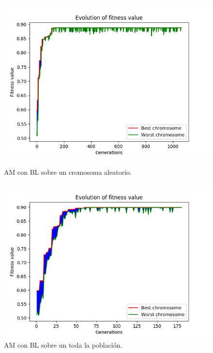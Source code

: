 \documentclass[11pt,a4paper]{article}
\begin{document}
\begin{figure}[H]
\centering
\begin{minipage}{.5\textwidth}
	\centering
	\includegraphics[scale=0.43]{img/am-rand-texture.png}
	\caption{AM con BL sobre un cromosoma aleatorio.}
\end{minipage}%
\begin{minipage}{.5\textwidth}
	\centering
	\includegraphics[scale=0.43]{img/am-all-texture.png}
	\caption{AM con BL sobre un toda la población.}
\end{minipage}
\end{figure}
\end{document}
